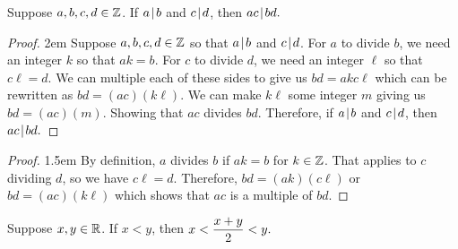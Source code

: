 \newpage 
\begin{claim}  Suppose $a,b,c,d \in \mathbb{Z}$.  If $a \! \mid \! b$ and $c \! \mid \! d$, then $ac \! \mid \! bd.$
\end{claim}

\begin{mdframed}[backgroundcolor=gray!10!]
\begin{mdframed}[backgroundcolor=white]
\begin{proof} \openup 2em
Suppose $a,b,c,d \in \mathbb{Z}$ so that $a \! \mid \! b$ and $c \! \mid \! d$.  For $a$ to divide $b$, we need an integer $k$ so that $ak=b$.  For $c$ to divide $d$, we need an integer $\ell$ so that $c\ell=d$.  We can multiple each of these sides to give us $bd=akc\ell$ which can be rewritten as $bd=(ac)(k\ell)$.  We can make $k\ell$ some integer $m$ giving us $bd=(ac)(m)$.  Showing that $ac$ divides $bd$.  Therefore, if $a \! \mid \! b$ and $c \! \mid \! d$, then $ac \! \mid \! bd.$
\end{proof}
\end{mdframed}

\begin{mdframed}[backgroundcolor=white]
\begin{proof} \openup 1.5em
By definition, $a$ divides $b$ if $ak=b$ for $k \in \mathbb{Z}$.  That applies to $c$ dividing $d$, so we have $c\ell=d.$  Therefore, $bd=(ak)(c\ell)$ or $bd=(ac)(k\ell)$ which shows that $ac$ is a multiple of $bd$.
\end{proof}
\end{mdframed}
\end{mdframed}

\medskip

\begin{claim}  Suppose $x,y \in \mathbb{R}$.  If $x<y$, then $\displaystyle x<\frac{x+y}{2} < y.$
\end{claim}

